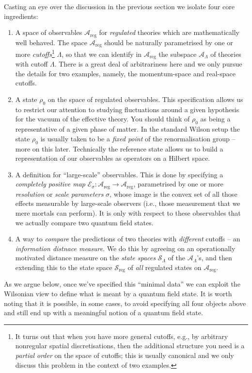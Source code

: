\documentclass[11pt]{amsart}
\theoremstyle{plain}%
\theoremstyle{definition}
\theoremstyle{remark}
\begin{document}
Casting an eye over the discussion in the previous section we isolate four core ingredients:
\begin{enumerate}
	\item A space of observables $\mathcal{A}_{\text{reg}}$ for \emph{regulated} theories which are mathematically well behaved. The space $\mathcal{A}_{\text{reg}}$ should be naturally parametrised by one or more \emph{cutoffs}\footnote{It turns out that when you have more general cutoffs, e.g., by arbitrary nonregular spatial discretisations, then the additional structure you need is a \emph{partial order} on the space of cutoffs; this is usually canonical and we only discuss this problem in the context of two examples.} $\Lambda$, so that we can identify in $\mathcal{A}_{\text{reg}}$ the subspace $\mathcal{A}_{\Lambda}$ of theories with cutoff $\Lambda$. There is a great deal of arbitrariness here and we only pursue the details for two examples, namely, the momentum-space and real-space cutoffs.
	\item A state $\rho_0$ on the space of regulated observables. This specification allows us to restrict our attention to studying fluctuations around a given hypothesis for the vacuum of the effective theory. You should think of $\rho_0$ as being a representative of a given phase of matter. In the standard Wilson setup the state $\rho_0$ is usually taken to be a \emph{fixed point} of the renormalisation group -- more on this later. Technically the reference state allows us to build a representation of our observables as operators on a Hilbert space.  
	\item A definition for ``large-scale'' observables. This is done by specifying a \emph{completely positive map} $\mathcal{E}_\sigma : \mathcal{A}_{\text{reg}} \rightarrow \mathcal{A}_{\text{reg}}$, parametrised by one or more \emph{resolution} or \emph{scale parameters} $\sigma$, whose image is the convex set of all those effects measurable by large-scale observers (i.e., those measurement that we mere mortals can perform). It is only with respect to these observables that we actually compare two quantum field states.
	\item A way to \emph{compare} the predictions of two theories with \emph{different} cutoffs -- an \emph{information distnace measure}. We do this by agreeing on an operationally motivated distance measure on the \emph{state spaces} $\mathcal{S}_\Lambda$ of the $\mathcal{A}_\Lambda$'s, and then extending this to the state space $\mathcal{S}_{\text{reg}}$ of \emph{all} regulated states on $\mathcal{A}_{\text{reg}}$.
\end{enumerate}  
As we argue below, once we've specified this ``minimal data'' we can exploit the Wilsonian view to define what is meant by a quantum field state. It is worth noting that it is possible, in some cases, to avoid specifying all four objects above and still end up with a meaningful notion of a quantum field state.
\end{document}
